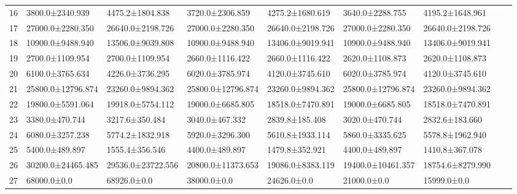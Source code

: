 \begin{tabular}{|r|l|l|l|l|l|l|l|l|}
  16 & 3800.0±2340.939 & 4475.2±1804.838 & 3720.0±2306.859 & 4275.2±1680.619 & 3640.0±2288.755 & 4195.2±1648.961 \\ 
  17 & 27000.0±2280.350 & 26640.0±2198.726 & 27000.0±2280.350 & 26640.0±2198.726 & 27000.0±2280.350 & 26640.0±2198.726 \\ 
  18 & 10900.0±9488.940 & 13506.0±9039.808 & 10900.0±9488.940 & 13406.0±9019.941 & 10900.0±9488.940 & 13406.0±9019.941 \\ 
  19 & 2700.0±1109.954 & 2700.0±1109.954 & 2660.0±1116.422 & 2660.0±1116.422 & 2620.0±1108.873 & 2620.0±1108.873 \\ 
  20 & 6100.0±3765.634 & 4226.0±3736.295 & 6020.0±3785.974 & 4120.0±3745.610 & 6020.0±3785.974 & 4120.0±3745.610 \\ 
  21 & 25800.0±12796.874 & 23260.0±9894.362 & 25800.0±12796.874 & 23260.0±9894.362 & 25800.0±12796.874 & 23260.0±9894.362 \\ 
  22 & 19800.0±5591.064 & 19918.0±5754.112 & 19000.0±6685.805 & 18518.0±7470.891 & 19000.0±6685.805 & 18518.0±7470.891 \\ 
  23 & 3380.0±470.744 & 3217.6±350.484 & 3040.0±467.332 & 2839.8±185.408 & 3020.0±470.744 & 2832.6±183.660 \\ 
  24 & 6080.0±3257.238 & 5774.2±1832.918 & 5920.0±3296.300 & 5610.8±1933.114 & 5860.0±3335.625 & 5578.8±1962.940 \\ 
  25 & 5400.0±489.897 & 1555.4±356.546 & 4400.0±489.897 & 1479.8±352.921 & 4400.0±489.897 & 1410.8±367.078 \\ 
  26 & 30200.0±24465.485 & 29536.0±23722.556 & 20800.0±11373.653 & 19086.0±8383.119 & 19400.0±10461.357 & 18754.6±8279.990 \\ 
  27 & 68000.0±0.0 & 68926.0±0.0 & 38000.0±0.0 & 24626.0±0.0 & 21000.0±0.0 & 15999.0±0.0 \\ 
\end{tabular}
